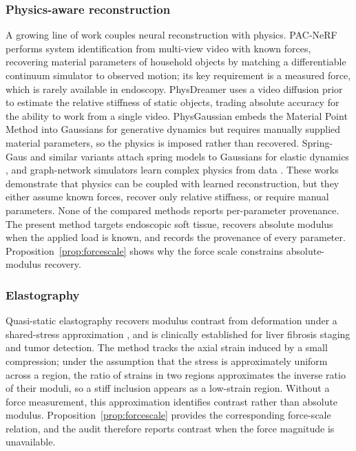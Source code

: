 \documentclass[pdflatex,lineno,referee,sn-vancouver,Numbered]{sn-jnl}
\begin{document}
\subsubsection{Physics-aware reconstruction}
A growing line of work couples neural reconstruction with physics.
PAC-NeRF \cite{pacnerf} performs system identification from multi-view
video with known forces, recovering material parameters of household
objects by matching a differentiable continuum simulator to observed
motion; its key requirement is a measured force, which is rarely available
in endoscopy. PhysDreamer \cite{physdreamer} uses a video diffusion prior
to estimate the relative stiffness of static objects, trading absolute
accuracy for the ability to work from a single video. PhysGaussian
\cite{physgaussian} embeds the Material Point Method into Gaussians for
generative dynamics but requires manually supplied material parameters, so
the physics is imposed rather than recovered. Spring-Gaus and similar
variants attach spring models to Gaussians for elastic dynamics
\cite{springgaus,physicallyembodied}, and graph-network simulators learn
complex physics from data \cite{sanchezgonzalez2020}. These works
demonstrate that physics can be coupled with learned reconstruction, but
they either assume known forces, recover only relative stiffness, or
require manual parameters. None of the compared methods reports
per-parameter provenance. The present method targets endoscopic soft tissue,
recovers absolute modulus when the applied load is known, and records the
provenance of every parameter. Proposition~\ref{prop:forcescale} shows why
the force scale constrains absolute-modulus recovery.

\subsubsection{Elastography}
Quasi-static elastography recovers modulus contrast from deformation under
a shared-stress approximation \cite{ophir1991,wells2011,sigrist2017}, and
is clinically established for liver fibrosis staging and tumor detection.
The method tracks the axial strain induced by a small compression; under
the assumption that the stress is approximately uniform across a region,
the ratio of strains in two regions approximates the inverse ratio of their
moduli, so a stiff inclusion appears as a low-strain region. Without a
force measurement, this approximation identifies contrast rather than
absolute modulus. Proposition~\ref{prop:forcescale} provides the
corresponding force-scale relation, and the audit therefore reports
contrast when the force magnitude is unavailable.
\end{document}
